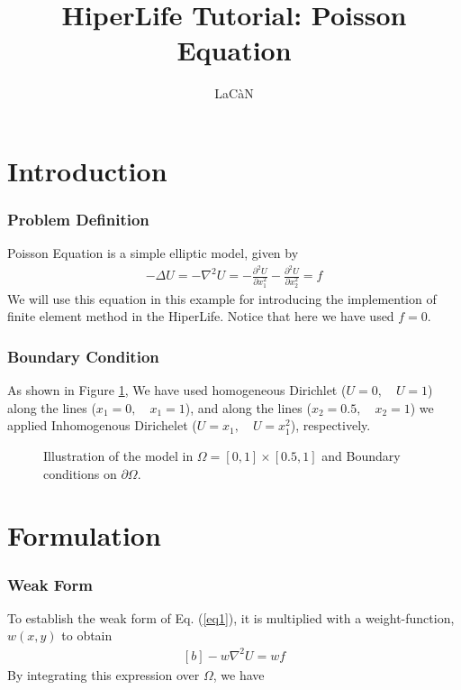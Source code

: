 \documentclass[]{article}
\begin{document}
\title{HiperLife Tutorial: Poisson Equation}
\author{LaCàN}
\maketitle

\linenumbers
\section{Introduction} \label{sec: Int}
\subsubsection{Problem Definition} \label{sec: pd} 
Poisson Equation is a simple elliptic model, given by
\begin{equation}\label{eq1}
	\begin{aligned}
		 -\Delta U = -\nabla^2 U = -\frac{\partial^2 U}{\partial x_{1}^2} - 
		\frac{\partial^2 U}{\partial x_{2}^2}=f
	\end{aligned}
\end{equation}
We will use this equation in this example for introducing the implemention of finite
element method in the HiperLife. Notice that here we have used $f = 0$.
\subsubsection{Boundary Condition} \label{sec: B.C}
As shown in Figure \ref{fig_SB}, We have used homogeneous Dirichlet ($U=0 ,\quad U=1$) along the lines ($x_{1}=0,\quad x_{1}=1$), and along the lines ($x_{2}=0.5,\quad x_{2}=1$) we applied Inhomogenous Dirichelet ($U=x_{1} ,\quad U=x_{1}^2$), respectively.

\begin{figure}[htbp]
	\centering
	
	\caption{Illustration of the model in $\Omega =[0,1]\times[0.5,1]$ and Boundary conditions on $\partial \Omega$.}
	\label{fig_SB}
\end{figure}

\section{Formulation} \label{sec: frml}
\subsubsection{Weak Form} \label{sec: WF}
To establish the weak form of Eq. (\ref{eq1}), it is multiplied with a weight-function, $w(x, y)$ to obtain
\begin{equation}\label{eq2}
	\begin{aligned}[b]
		-w\nabla^2 U = wf
	\end{aligned}
\end{equation}
By integrating this expression over $\Omega$, we have
\end{document}
